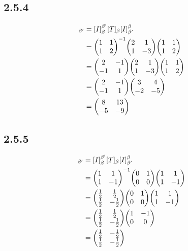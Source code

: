 \documentclass[12pt,titlepage]{extarticle}
\begin{document}
\subsection*{2.5.4}
\begin{align*}
    [T]_{\beta'} &= [I]_{\beta}^{\beta'} [T]_{\beta} [I]_{\beta'}^{\beta} \\
                 &= \mqty(1 & 1 \\ 1 & 2)^{-1}
                    \mqty(2 & 1 \\ 1 & -3) 
                    \mqty(1 & 1 \\ 1 & 2) \\
                 &= \mqty(2 & -1 \\ -1 & 1)
                    \mqty(2 & 1 \\ 1 & -3) 
                    \mqty(1 & 1 \\ 1 & 2) \\
                 &= \mqty(2 & -1 \\ -1 & 1)
                    \mqty(3 & 4 \\ -2 & -5) \\ 
                 &= \mqty(8 & 13 \\ -5 & -9)
\end{align*}

\subsection*{2.5.5}
\begin{align*}
    [T]_{\beta'} &= [I]_{\beta}^{\beta'} [T]_{\beta} [I]_{\beta'}^{\beta} \\
    &= 
    \mqty(
        1 & 1 \\
        1 & -1
    )^{-1}
    \mqty(
        0 & 1 \\
        0 & 0 \\
    )
    \mqty(
        1 & 1 \\
        1 & -1
    ) \\
    &=
    \mqty(
        \frac{1}{2} & \frac{1}{2} \\
        \frac{1}{2} & -\frac{1}{2}
    )
    \mqty(
        0 & 1 \\
        0 & 0 \\
    )
    \mqty(
        1 & 1 \\
        1 & -1
    ) \\
    &=
    \mqty(
        \frac{1}{2} & \frac{1}{2} \\
        \frac{1}{2} & -\frac{1}{2}
    )
    \mqty(
        1 & -1 \\
        0 & 0 \\
    ) \\
    &=
    \mqty(
        \frac{1}{2} & -\frac{1}{2} \\
        \frac{1}{2} & -\frac{1}{2} \\
    )
\end{align*}
\end{document}
